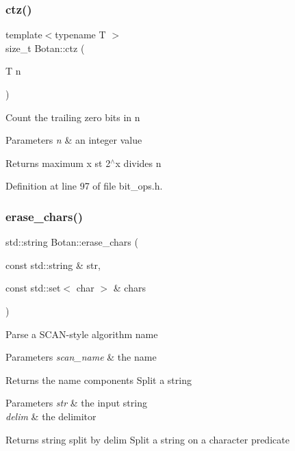 \subsubsection{\texorpdfstring{ctz()}{ctz()}}
{\footnotesize\ttfamily template$<$typename T $>$ \\
size\+\_\+t Botan\+::ctz (\begin{DoxyParamCaption}\item[{T}]{n }\end{DoxyParamCaption})\hspace{0.3cm}{\ttfamily [inline]}}

Count the trailing zero bits in n 
\begin{DoxyParams}{Parameters}
{\em n} & an integer value \\
\hline
\end{DoxyParams}
\begin{DoxyReturn}{Returns}
maximum x st 2$^\wedge$x divides n 
\end{DoxyReturn}


Definition at line 97 of file bit\+\_\+ops.\+h.

\mbox{\label{namespace_botan_a27c25f0333e84e5540be288b4298b766}} 
\subsubsection{\texorpdfstring{erase\+\_\+chars()}{erase\_chars()}}
{\footnotesize\ttfamily std\+::string Botan\+::erase\+\_\+chars (\begin{DoxyParamCaption}\item[{const std\+::string \&}]{str,  }\item[{const std\+::set$<$ char $>$ \&}]{chars }\end{DoxyParamCaption})}

Parse a S\+C\+A\+N-\/style algorithm name 
\begin{DoxyParams}{Parameters}
{\em scan\+\_\+name} & the name \\
\hline
\end{DoxyParams}
\begin{DoxyReturn}{Returns}
the name components Split a string 
\end{DoxyReturn}

\begin{DoxyParams}{Parameters}
{\em str} & the input string \\
\hline
{\em delim} & the delimitor \\
\hline
\end{DoxyParams}
\begin{DoxyReturn}{Returns}
string split by delim Split a string on a character predicate 
\end{DoxyReturn}

